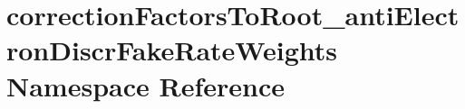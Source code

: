 \hypertarget{namespacecorrectionFactorsToRoot__antiElectronDiscrFakeRateWeights}{
\section{correctionFactorsToRoot\_\-antiElectronDiscrFakeRateWeights Namespace Reference}
\label{namespacecorrectionFactorsToRoot__antiElectronDiscrFakeRateWeights}
}
